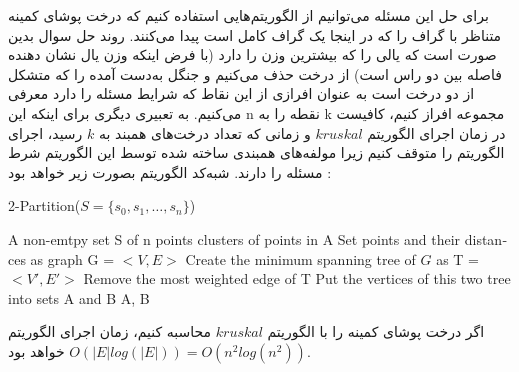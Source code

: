 \documentclass[]{article}
\begin{document}
برای حل این مسئله می‌توانیم از الگوریتم‌هایی استفاده کنیم که درخت پوشای کمینه متناظر
با گراف را که در اینجا یک گراف کامل است پیدا می‌کنند.
روند حل سوال بدین صورت است که یالی را که بیشترین وزن را دارد (با فرض اینکه وزن یال نشان دهنده فاصله بین دو راس است)
از درخت حذف می‌کنیم و جنگل به‌دست آمده را که متشکل از دو درخت است به عنوان افرازی از این نقاط
که شرایط مسئله را دارد معرفی می‌کنیم.
به تعبیری دیگری برای اینکه این n نقطه را به k مجموعه افراز کنیم،
کافیست در زمان اجرای الگوریتم $kruskal$ و زمانی که تعداد درخت‌های همبند به $k$ رسید،
اجرای الگوریتم را متوقف کنیم زیرا مولفه‌های همبندی ساخته شده توسط این الگوریتم شرط مسئله را دارند.
شبه‌کد الگوریتم بصورت زیر خواهد بود :

\begin{latin}
    \begin{algorithm}[H]
        \caption*{2-Partition($S = \lbrace s_0, s_1, \ldots, s_n \rbrace $)}
        \begin{algorithmic}
            \Require A non-emtpy set S of n points
             clusters of points in A
            \State Set points and their distances as graph G = $<V, E>$
            \State Create the minimum spanning tree of $G$ as T = $<V', E'>$ 
            \State Remove the most weighted edge of T
            \State Put the vertices of this two tree into sets A and B
            \State \Return A, B
        \end{algorithmic}
    \end{algorithm}
\end{latin}
اگر درخت پوشای کمینه را با الگوریتم $kruskal$ محاسبه کنیم،
زمان اجرای الگوریتم $O(|E|log(|E|))=O(n^2log(n^2))$ خواهد بود.
\end{document}
